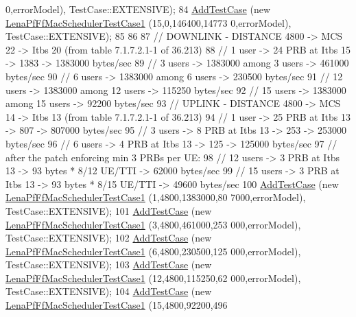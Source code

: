 \begin{DoxyCode}
      0,errorModel), TestCase::EXTENSIVE);
84   \hyperlink{classns3_1_1TestCase_a3718088e3eefd5d6454569d2e0ddd835}{AddTestCase} (\textcolor{keyword}{new} \hyperlink{classLenaPfFfMacSchedulerTestCase1}{LenaPfFfMacSchedulerTestCase1} (15,0,146400,14773
      0,errorModel), TestCase::EXTENSIVE);
85   
86  
87   \textcolor{comment}{// DOWNLINK - DISTANCE 4800 -> MCS 22 -> Itbs 20 (from table 7.1.7.2.1-1 of 36.213)}
88   \textcolor{comment}{// 1 user -> 24 PRB at Itbs 15 -> 1383 -> 1383000 bytes/sec}
89   \textcolor{comment}{// 3 users -> 1383000 among 3 users -> 461000 bytes/sec}
90   \textcolor{comment}{// 6 users -> 1383000 among 6 users -> 230500 bytes/sec}
91   \textcolor{comment}{// 12 users -> 1383000 among 12 users -> 115250 bytes/sec}
92   \textcolor{comment}{// 15 users -> 1383000 among 15 users -> 92200 bytes/sec}
93   \textcolor{comment}{// UPLINK - DISTANCE 4800 -> MCS 14 -> Itbs 13 (from table 7.1.7.2.1-1 of 36.213)}
94   \textcolor{comment}{// 1 user -> 25 PRB at Itbs 13 -> 807 -> 807000 bytes/sec}
95   \textcolor{comment}{// 3 users -> 8 PRB at Itbs 13 -> 253 -> 253000 bytes/sec}
96   \textcolor{comment}{// 6 users -> 4 PRB at Itbs 13 -> 125 -> 125000 bytes/sec}
97   \textcolor{comment}{// after the patch enforcing min 3 PRBs per UE:}
98   \textcolor{comment}{// 12 users -> 3 PRB at Itbs 13 -> 93  bytes * 8/12 UE/TTI  -> 62000 bytes/sec}
99   \textcolor{comment}{// 15 users -> 3 PRB at Itbs 13 -> 93  bytes * 8/15 UE/TTI  -> 49600 bytes/sec}
100   \hyperlink{classns3_1_1TestCase_a3718088e3eefd5d6454569d2e0ddd835}{AddTestCase} (\textcolor{keyword}{new} \hyperlink{classLenaPfFfMacSchedulerTestCase1}{LenaPfFfMacSchedulerTestCase1} (1,4800,1383000,80
      7000,errorModel), TestCase::EXTENSIVE);
101   \hyperlink{classns3_1_1TestCase_a3718088e3eefd5d6454569d2e0ddd835}{AddTestCase} (\textcolor{keyword}{new} \hyperlink{classLenaPfFfMacSchedulerTestCase1}{LenaPfFfMacSchedulerTestCase1} (3,4800,461000,253
      000,errorModel), TestCase::EXTENSIVE);
102   \hyperlink{classns3_1_1TestCase_a3718088e3eefd5d6454569d2e0ddd835}{AddTestCase} (\textcolor{keyword}{new} \hyperlink{classLenaPfFfMacSchedulerTestCase1}{LenaPfFfMacSchedulerTestCase1} (6,4800,230500,125
      000,errorModel), TestCase::EXTENSIVE);
103   \hyperlink{classns3_1_1TestCase_a3718088e3eefd5d6454569d2e0ddd835}{AddTestCase} (\textcolor{keyword}{new} \hyperlink{classLenaPfFfMacSchedulerTestCase1}{LenaPfFfMacSchedulerTestCase1} (12,4800,115250,62
      000,errorModel), TestCase::EXTENSIVE);
104   \hyperlink{classns3_1_1TestCase_a3718088e3eefd5d6454569d2e0ddd835}{AddTestCase} (\textcolor{keyword}{new} \hyperlink{classLenaPfFfMacSchedulerTestCase1}{LenaPfFfMacSchedulerTestCase1} (15,4800,92200,496

\end{DoxyCode}
